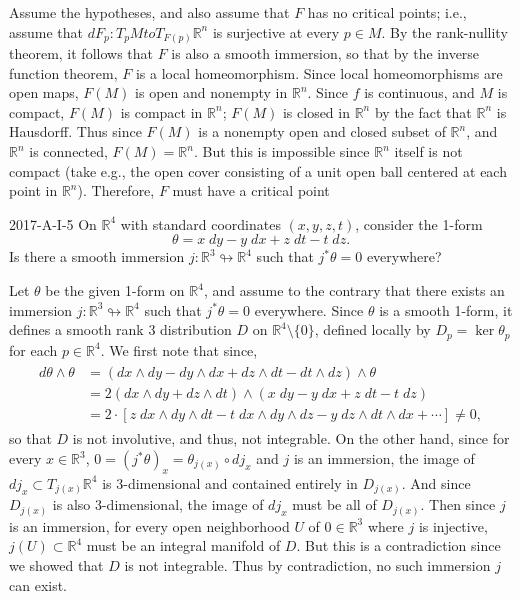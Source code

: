 \documentclass{article}
\begin{document}
	Assume the hypotheses, and also assume that $F$ has no critical points; i.e., assume that $dF_{p}: T_{p}M to T_{F(p)}\mathbb{R}^{n}$ is surjective at every $p \in M$. By the rank-nullity theorem, it follows that $F$ is also a smooth immersion, so that by the inverse function theorem, $F$ is a local homeomorphism. Since local homeomorphisms are open maps, $F(M)$ is open and nonempty in $\mathbb{R}^{n}$. Since $f$ is continuous, and $M$ is compact, $F(M)$ is compact in $\mathbb{R}^{n}$; $F(M)$ is closed in $\mathbb{R}^{n}$ by the fact that $\mathbb{R}^{n}$ is Hausdorff. Thus since $F(M)$ is a nonempty open and closed subset of $\mathbb{R}^{n}$, and $\mathbb{R}^{n}$ is connected, $F(M) = \mathbb{R}^{n}$. But this is impossible since $\mathbb{R}^{n}$ itself is not compact (take e.g., the open cover consisting of a unit open ball centered at each point in $\mathbb{R}^{n}$). Therefore, $F$ must have a critical point 
	
	\begin{prb}{2017-A-I-5}
		On $\mathbb{R}^{4}$ with standard coordinates $(x,y,z,t)$, consider the 1-form 
		\begin{equation*}
			\theta = x\;dy - y\;dx + z\;dt - t\;dz. 
		\end{equation*}
		Is there a smooth immersion $j: \mathbb{R}^{3} \looparrowright \mathbb{R}^{4}$ such that $j^{\ast}\theta = 0$ everywhere? 
	\end{prb}
	Let $\theta$ be the given 1-form on $\mathbb{R}^{4}$, and assume to the contrary that there exists an immersion $j: \mathbb{R}^{3} \looparrowright \mathbb{R}^{4}$ such that $j^{\ast}\theta = 0$ everywhere. Since $\theta$ is a smooth 1-form, it defines a smooth rank 3 distribution $D$ on $\mathbb{R}^{4}\setminus \{0\}$, defined locally by $D_{p} = \ker{\theta_{p}}$ for each $p \in \mathbb{R}^{4}$. We first note that since, 
	\begin{align*}
		\begin{split}
			d\theta \wedge \theta &= (dx\wedge dy - dy\wedge dx + dz\wedge dt - dt\wedge dz) \wedge \theta \\
			&= 2(dx\wedge dy + dz \wedge dt) \wedge (x\;dy - y\;dx + z\;dt - t\;dz) \\
			&= 2 \cdot \left[z\;dx \wedge dy \wedge dt - t\;dx \wedge dy \wedge dz - y\;dz \wedge dt \wedge dx + \dotsm\right] \neq 0, 
		\end{split}
	\end{align*}
	so that $D$ is not involutive, and thus, not integrable. On the other hand, since for every $x \in \mathbb{R}^{3}$, $0 = (j^{\ast}\theta)_{x} = \theta_{j(x)} \circ dj_{x}$ and $j$ is an immersion, the image of $dj_{x} \subset T_{j(x)}\mathbb{R}^{4}$ is 3-dimensional and contained entirely in $D_{j(x)}$. And since $D_{j(x)}$ is also 3-dimensional, the image of $dj_{x}$ must be all of $D_{j(x)}$. Then since $j$ is an immersion, for every open neighborhood $U$ of $0 \in \mathbb{R}^{3}$ where $j$ is injective, $j(U) \subset \mathbb{R}^{4}$ must be an integral manifold of $D$. But this is a contradiction since we showed that $D$ is not integrable. Thus by contradiction, no such immersion $j$ can exist. 
	
\end{document}
